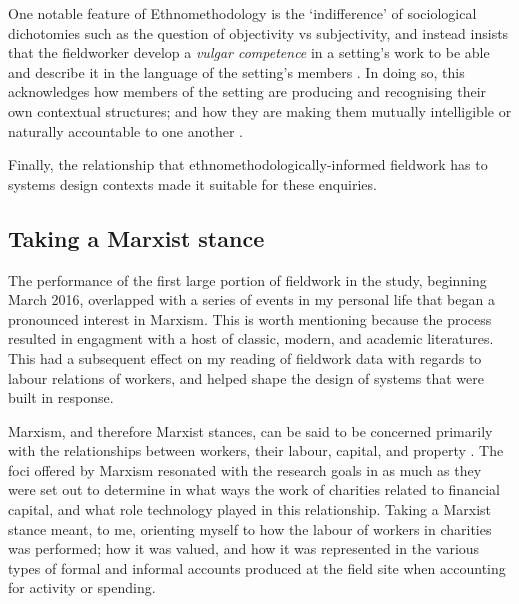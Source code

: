 One notable feature of Ethnomethodology is the `indifference' of sociological dichotomies such as the question of objectivity vs subjectivity, and instead insists that the fieldworker develop a \textit{vulgar competence} in a setting's work to be able and describe it in the language of the setting's members \cite{randall_fieldwork_2007, crabtree_doing_2012}. In doing so, this acknowledges how members of the setting are producing and recognising their own contextual structures; and how they are making them mutually intelligible or naturally accountable to one another \cite{garfinkel_studies_1967, randall_fieldwork_2007}.


Finally, the relationship that ethnomethodologically-informed fieldwork has to systems design contexts made it suitable for these enquiries. 


\subsection{Taking a Marxist stance}

The performance of the first large portion of fieldwork in the study, beginning March 2016, overlapped with a series of events in my personal life that began a pronounced interest in Marxism. This is worth mentioning because the process resulted in engagment with a host of classic, modern, and academic literatures. This had a subsequent effect on my reading of fieldwork data with regards to labour relations of workers, and helped shape the design of systems that were built in response.


Marxism, and therefore Marxist stances, can be said to be concerned primarily with the relationships between workers, their labour, capital, and property \cite{singer_marx:_2001, johnson_blackwell_2012}. The foci offered by Marxism resonated with the research goals in as much as they were set out to determine in what ways the work of charities related to financial capital, and what role technology played in this relationship. Taking a Marxist stance meant, to me, orienting myself to how the labour of workers in charities was performed; how it was valued, and how it was represented in the various types of formal and informal accounts produced at the field site when accounting for activity or spending.

